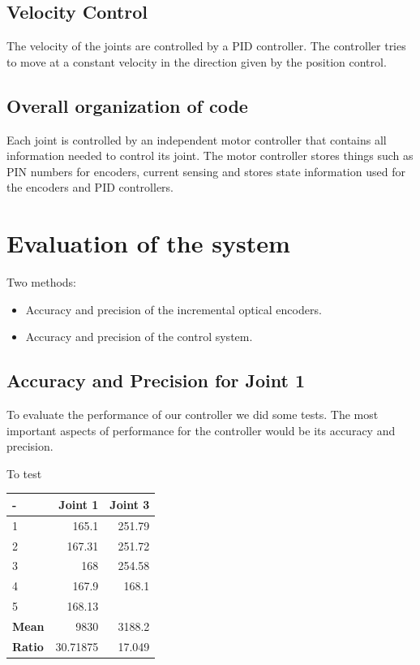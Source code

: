 \documentclass[10pt,a4paper]{article}
\begin{document}
\subsection{Velocity Control}
The velocity of the joints are controlled by a PID controller. The controller tries to move at a constant velocity in the direction given by the position control. 

\subsection{Overall organization of code}
Each joint is controlled by an independent motor controller that contains all information needed to control its joint. The motor controller stores things such as PIN numbers for encoders, current sensing and stores state information used for the encoders and PID controllers.

\section{Evaluation of the system}
Two methods:
\begin{itemize}
\item Accuracy and precision of the incremental optical encoders.
\item Accuracy and precision of the control system.
\end{itemize}

\subsection{Accuracy and Precision for Joint 1}
To evaluate the performance of our controller we did some tests. The most important aspects of performance for the controller would be its accuracy and precision.

To test 

\begin{tabular}{ | l | r | r |}
\hline
- & \textbf{Joint 1} & \textbf{Joint 3} \\
\hline
1 & 165.1 & 251.79 \\
\hline
2 & 167.31 & 251.72 \\
\hline
3 & 168 & 254.58 \\
\hline
4 & 167.9 & 168.1 \\
\hline
5 & 168.13 & \\
\hline
\textbf{Mean} & 9830 & 3188.2 \\
\hline
\textbf{Ratio} & 30.71875 & 17.049 \\
\hline
\end{tabular}
\end{document}
